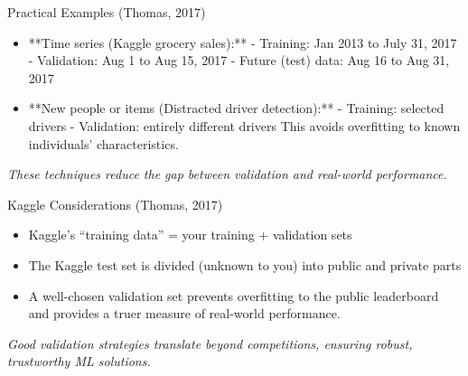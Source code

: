 \documentclass[aspectratio=169]{beamer}
\begin{document}
%
\begin{frame}{Practical Examples (Thomas, 2017)}
\begin{itemize}
\item **Time series (Kaggle grocery sales):**
  - Training: Jan 2013 to July 31, 2017
  - Validation: Aug 1 to Aug 15, 2017
  - Future (test) data: Aug 16 to Aug 31, 2017
\item **New people or items (Distracted driver detection):**
  - Training: selected drivers
  - Validation: entirely different drivers
  This avoids overfitting to known individuals’ characteristics.
\end{itemize}

\emph{These techniques reduce the gap between validation and real-world performance.}
\end{frame}

%
\begin{frame}{Kaggle Considerations (Thomas, 2017)}
\begin{itemize}
\item Kaggle’s “training data” = your training + validation sets
\item The Kaggle test set is divided (unknown to you) into public and private parts
\item A well-chosen validation set prevents overfitting to the public leaderboard and provides a truer measure of real-world performance.
\end{itemize}

\emph{Good validation strategies translate beyond competitions, ensuring robust, trustworthy ML solutions.}
\end{frame}
\end{document}
